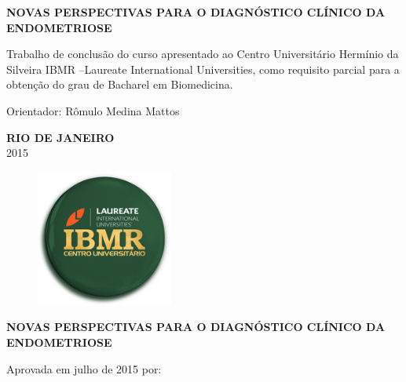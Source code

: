 \documentclass[12pt]{article} %
\begin{document}
\begin{center}
\MakeUppercase{\textbf{Novas perspectivas para o diagnóstico clínico da endometriose}}
\end{center}

\vspace{4.5cm}
Trabalho de conclusão do curso apresentado ao Centro Universitário Hermínio da Silveira IBMR  –Laureate International Universities, como requisito parcial para a obtenção do grau de Bacharel em Biomedicina.

\vspace{2.5cm}

\theauthor

\vspace{2.5cm}

Orientador: Rômulo Medina Mattos

\vspace{2.0cm}
\begin{center}
\MakeUppercase{\textbf{Rio de Janeiro}}\\
2015
\end{center}

\newpage


\begin{figure}[h!]
\centering
\includegraphics[width=4.5cm]{ibmr.png}
\end{figure}


\begin{center}
\MakeUppercase{\theauthor}
\end{center}

\vspace{2.0cm}

\begin{center}
\MakeUppercase{\textbf{Novas perspectivas para o diagnóstico clínico da endometriose}}
\end{center}

\vspace{2.0cm}

Aprovada em julho de 2015 por:

\vspace{9.0cm}
\end{document}
